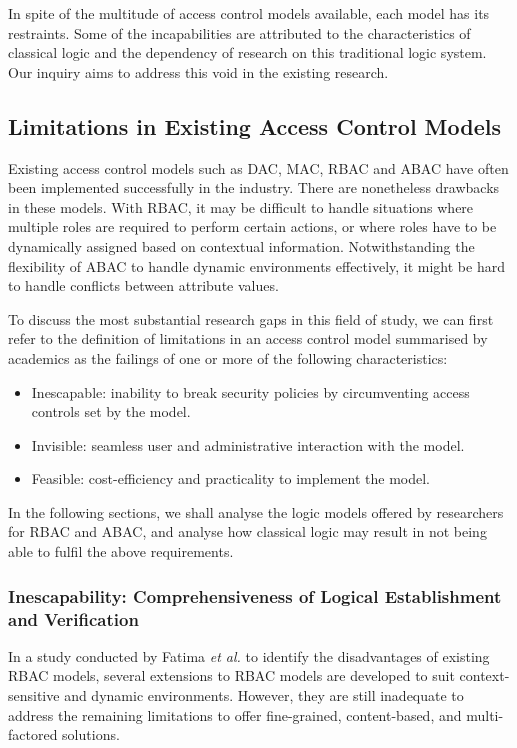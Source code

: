 \documentclass{article}
\begin{document}
In spite of the multitude of access control models available, each model
has its restraints. Some of the incapabilities are attributed to the
characteristics of classical logic and the dependency of research on this
traditional logic system. Our inquiry aims to address this void in the
existing research.

\subsection{Limitations in Existing Access Control Models}

Existing access control models such as DAC, MAC, RBAC and ABAC have often been
implemented successfully in the industry. There are nonetheless drawbacks
in these models. With RBAC, it may be difficult to handle situations where
multiple roles are required to perform certain actions, or where roles have
to be dynamically assigned based on contextual information. Notwithstanding
the flexibility of ABAC to handle dynamic environments effectively, it might
be hard to handle conflicts between attribute values.

To discuss the most substantial research gaps in this field of study, we
can first refer to the definition of limitations in an access control model
summarised by academics as the failings of one or more of the following
characteristics: \cite{limitations} \begin{itemize}
    \item Inescapable: inability to break security policies by circumventing
    access controls set by the model.  \item Invisible: seamless user and
    administrative interaction with the model.  \item Feasible: cost-efficiency
    and practicality to implement the model.
\end{itemize}

In the following sections, we shall analyse the logic models offered by
researchers for RBAC and ABAC, and analyse how classical logic may result
in not being able to fulfil the above requirements.

\subsubsection{Inescapability: Comprehensiveness of Logical Establishment
and Verification}

In a study conducted by Fatima \textit{et al.} to identify the disadvantages
of existing RBAC models, several extensions to RBAC models are developed to
suit context-sensitive and dynamic environments.\cite{rbac-vs-abac} However,
they are still inadequate to address the remaining limitations to offer
fine-grained, content-based, and multi-factored solutions.
\end{document}

